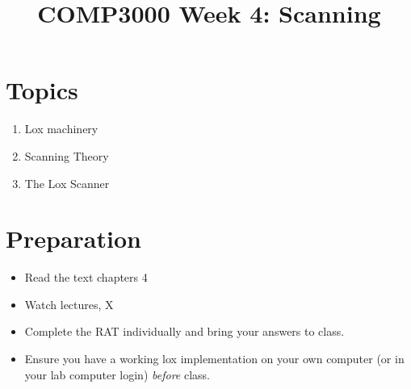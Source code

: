 \documentclass[twoside=false, DIV=14]{scrartcl}
\title{\color{redish} \vspace{-1em}COMP3000 Week 4: Scanning}
\begin{document}
{\color{blackish}\maketitle}\vspace{-7em}

\begin{abstract}
\end{abstract}

\section*{Topics}
\begin{enumerate}
\item Lox machinery
\item Scanning Theory
\item The Lox Scanner
\end{enumerate}

\section*{Preparation}
\begin{itemize}
\item Read the text chapters 4
\item Watch lectures, X
\item Complete the RAT individually and bring your answers to class.
\item Ensure you have a working lox implementation on your own computer (or in your lab computer login) \emph{before} class.
\end{itemize}

\newpage
\end{document}
